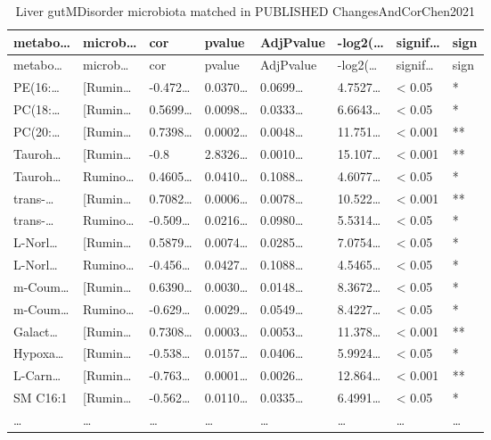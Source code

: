 \documentclass[
]{article}
\begin{document}
\begin{longtable}[]{@{}llllllll@{}}
\caption{\label{tab:Liver-gutMDisorder-microbiota-matched-in-PUBLISHED-ChangesAndCorChen2021}Liver gutMDisorder microbiota matched in PUBLISHED ChangesAndCorChen2021}\tabularnewline
\toprule
metabo\ldots{} & microb\ldots{} & cor & pvalue & AdjPvalue & -log2(\ldots{} & signif\ldots{} & sign\tabularnewline
\midrule
\endfirsthead
\toprule
metabo\ldots{} & microb\ldots{} & cor & pvalue & AdjPvalue & -log2(\ldots{} & signif\ldots{} & sign\tabularnewline
\midrule
\endhead
PE(16:\ldots{} & {[}Rumin\ldots{} & -0.472\ldots{} & 0.0370\ldots{} & 0.0699\ldots{} & 4.7527\ldots{} & \textless{} 0.05 & *\tabularnewline
PC(18:\ldots{} & {[}Rumin\ldots{} & 0.5699\ldots{} & 0.0098\ldots{} & 0.0333\ldots{} & 6.6643\ldots{} & \textless{} 0.05 & *\tabularnewline
PC(20:\ldots{} & {[}Rumin\ldots{} & 0.7398\ldots{} & 0.0002\ldots{} & 0.0048\ldots{} & 11.751\ldots{} & \textless{} 0.001 & **\tabularnewline
Tauroh\ldots{} & {[}Rumin\ldots{} & -0.8 & 2.8326\ldots{} & 0.0010\ldots{} & 15.107\ldots{} & \textless{} 0.001 & **\tabularnewline
Tauroh\ldots{} & Rumino\ldots{} & 0.4605\ldots{} & 0.0410\ldots{} & 0.1088\ldots{} & 4.6077\ldots{} & \textless{} 0.05 & *\tabularnewline
trans-\ldots{} & {[}Rumin\ldots{} & 0.7082\ldots{} & 0.0006\ldots{} & 0.0078\ldots{} & 10.522\ldots{} & \textless{} 0.001 & **\tabularnewline
trans-\ldots{} & Rumino\ldots{} & -0.509\ldots{} & 0.0216\ldots{} & 0.0980\ldots{} & 5.5314\ldots{} & \textless{} 0.05 & *\tabularnewline
L-Norl\ldots{} & {[}Rumin\ldots{} & 0.5879\ldots{} & 0.0074\ldots{} & 0.0285\ldots{} & 7.0754\ldots{} & \textless{} 0.05 & *\tabularnewline
L-Norl\ldots{} & Rumino\ldots{} & -0.456\ldots{} & 0.0427\ldots{} & 0.1088\ldots{} & 4.5465\ldots{} & \textless{} 0.05 & *\tabularnewline
m-Coum\ldots{} & {[}Rumin\ldots{} & 0.6390\ldots{} & 0.0030\ldots{} & 0.0148\ldots{} & 8.3672\ldots{} & \textless{} 0.05 & *\tabularnewline
m-Coum\ldots{} & Rumino\ldots{} & -0.629\ldots{} & 0.0029\ldots{} & 0.0549\ldots{} & 8.4227\ldots{} & \textless{} 0.05 & *\tabularnewline
Galact\ldots{} & {[}Rumin\ldots{} & 0.7308\ldots{} & 0.0003\ldots{} & 0.0053\ldots{} & 11.378\ldots{} & \textless{} 0.001 & **\tabularnewline
Hypoxa\ldots{} & {[}Rumin\ldots{} & -0.538\ldots{} & 0.0157\ldots{} & 0.0406\ldots{} & 5.9924\ldots{} & \textless{} 0.05 & *\tabularnewline
L-Carn\ldots{} & {[}Rumin\ldots{} & -0.763\ldots{} & 0.0001\ldots{} & 0.0026\ldots{} & 12.864\ldots{} & \textless{} 0.001 & **\tabularnewline
SM C16:1 & {[}Rumin\ldots{} & -0.562\ldots{} & 0.0110\ldots{} & 0.0335\ldots{} & 6.4991\ldots{} & \textless{} 0.05 & *\tabularnewline
\ldots{} & \ldots{} & \ldots{} & \ldots{} & \ldots{} & \ldots{} & \ldots{} & \ldots{}\tabularnewline
\bottomrule
\end{longtable}
\end{document}
